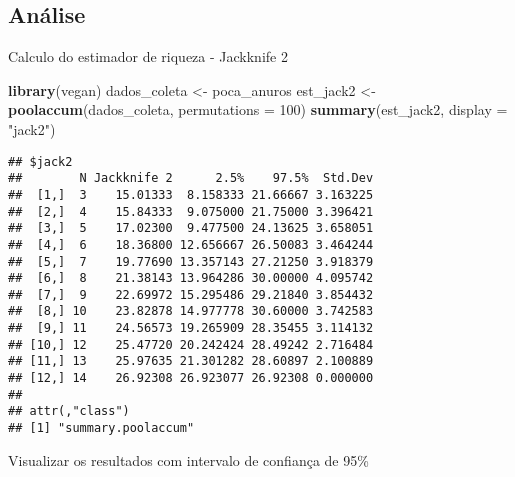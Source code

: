 \documentclass[
]{book}
\newenvironment{Shaded}{\begin{snugshade}}{\end{snugshade}}
\newcommand{\DataTypeTok}[1]{\textcolor[rgb]{0.13,0.29,0.53}{#1}}
\newcommand{\DecValTok}[1]{\textcolor[rgb]{0.00,0.00,0.81}{#1}}
\newcommand{\KeywordTok}[1]{\textcolor[rgb]{0.13,0.29,0.53}{\textbf{#1}}}
\newcommand{\NormalTok}[1]{#1}
\newcommand{\StringTok}[1]{\textcolor[rgb]{0.31,0.60,0.02}{#1}}
\begin{document}
\hypertarget{anuxe1lise-4}{%
\subsection{Análise}\label{anuxe1lise-4}}

Calculo do estimador de riqueza - Jackknife 2

\begin{Shaded}
\begin{Highlighting}[]
\KeywordTok{library}\NormalTok{(vegan)}
\NormalTok{dados_coleta <-}\StringTok{ }\NormalTok{poca_anuros}
\NormalTok{est_jack2 <-}\StringTok{ }\KeywordTok{poolaccum}\NormalTok{(dados_coleta, }\DataTypeTok{permutations =} \DecValTok{100}\NormalTok{)}
\KeywordTok{summary}\NormalTok{(est_jack2, }\DataTypeTok{display =} \StringTok{"jack2"}\NormalTok{)}
\end{Highlighting}
\end{Shaded}

\begin{verbatim}
## $jack2
##        N Jackknife 2      2.5%    97.5%  Std.Dev
##  [1,]  3    15.01333  8.158333 21.66667 3.163225
##  [2,]  4    15.84333  9.075000 21.75000 3.396421
##  [3,]  5    17.02300  9.477500 24.13625 3.658051
##  [4,]  6    18.36800 12.656667 26.50083 3.464244
##  [5,]  7    19.77690 13.357143 27.21250 3.918379
##  [6,]  8    21.38143 13.964286 30.00000 4.095742
##  [7,]  9    22.69972 15.295486 29.21840 3.854432
##  [8,] 10    23.82878 14.977778 30.60000 3.742583
##  [9,] 11    24.56573 19.265909 28.35455 3.114132
## [10,] 12    25.47720 20.242424 28.49242 2.716484
## [11,] 13    25.97635 21.301282 28.60897 2.100889
## [12,] 14    26.92308 26.923077 26.92308 0.000000
## 
## attr(,"class")
## [1] "summary.poolaccum"
\end{verbatim}

Visualizar os resultados com intervalo de confiança de 95\%
\end{document}
